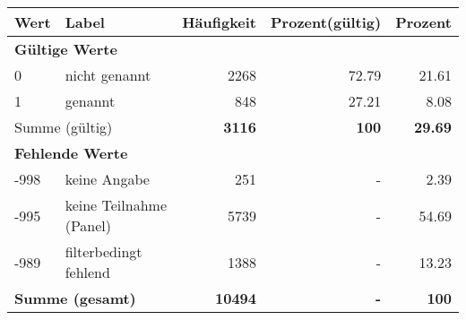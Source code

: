      \begin{longtable}{lXrrr}
     \toprule
     \textbf{Wert} & \textbf{Label} & \textbf{Häufigkeit} & \textbf{Prozent(gültig)} & \textbf{Prozent} \\
     \endhead
     \midrule
     \multicolumn{5}{l}{\textbf{Gültige Werte}}\\

     0 &
     \multicolumn{1}{X}{ nicht genannt   } &


       \num{2268} &
       \num[round-mode=places,round-precision=2]{72.79} &
         \num[round-mode=places,round-precision=2]{21.61} \\

     1 &
     \multicolumn{1}{X}{ genannt   } &


       \num{848} &
       \num[round-mode=places,round-precision=2]{27.21} &
         \num[round-mode=places,round-precision=2]{8.08} \\
     \midrule
     \multicolumn{2}{l}{Summe (gültig)} &
       \textbf{\num{3116}} &
     \textbf{\num{100}} &
       \textbf{\num[round-mode=places,round-precision=2]{29.69}} \\
     \multicolumn{5}{l}{\textbf{Fehlende Werte}}\\
       -998 &
       keine Angabe &
         \num{251} &
        - &
         \num[round-mode=places,round-precision=2]{2.39} \\
       -995 &
       keine Teilnahme (Panel) &
         \num{5739} &
        - &
         \num[round-mode=places,round-precision=2]{54.69} \\
       -989 &
       filterbedingt fehlend &
         \num{1388} &
        - &
         \num[round-mode=places,round-precision=2]{13.23} \\
     \midrule
     \multicolumn{2}{l}{\textbf{Summe (gesamt)}} &
          \textbf{\num{10494}} &
        \textbf{-} &
        \textbf{\num{100}} \\
     \bottomrule
     \end{longtable}
     
